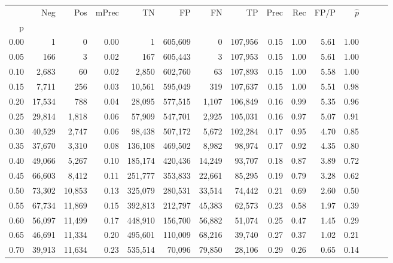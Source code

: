 \begin{tabular}{rrrrrrrrrrrrrrr}
\toprule
{} &     Neg &     Pos & mPrec &       TN &       FP &       FN &       TP &  Prec &   Rec &  FP/P & $\hat{p}$ \\
p    &         &         &       &          &          &          &          &       &       &       &           \\
\midrule
0.00 &       1 &       0 &  0.00 &        1 &  605,609 &        0 &  107,956 &  0.15 &  1.00 &  5.61 &      1.00 \\
0.05 &     166 &       3 &  0.02 &      167 &  605,443 &        3 &  107,953 &  0.15 &  1.00 &  5.61 &      1.00 \\
0.10 &   2,683 &      60 &  0.02 &    2,850 &  602,760 &       63 &  107,893 &  0.15 &  1.00 &  5.58 &      1.00 \\
0.15 &   7,711 &     256 &  0.03 &   10,561 &  595,049 &      319 &  107,637 &  0.15 &  1.00 &  5.51 &      0.98 \\
0.20 &  17,534 &     788 &  0.04 &   28,095 &  577,515 &    1,107 &  106,849 &  0.16 &  0.99 &  5.35 &      0.96 \\
0.25 &  29,814 &   1,818 &  0.06 &   57,909 &  547,701 &    2,925 &  105,031 &  0.16 &  0.97 &  5.07 &      0.91 \\
0.30 &  40,529 &   2,747 &  0.06 &   98,438 &  507,172 &    5,672 &  102,284 &  0.17 &  0.95 &  4.70 &      0.85 \\
0.35 &  37,670 &   3,310 &  0.08 &  136,108 &  469,502 &    8,982 &   98,974 &  0.17 &  0.92 &  4.35 &      0.80 \\
0.40 &  49,066 &   5,267 &  0.10 &  185,174 &  420,436 &   14,249 &   93,707 &  0.18 &  0.87 &  3.89 &      0.72 \\
0.45 &  66,603 &   8,412 &  0.11 &  251,777 &  353,833 &   22,661 &   85,295 &  0.19 &  0.79 &  3.28 &      0.62 \\
0.50 &  73,302 &  10,853 &  0.13 &  325,079 &  280,531 &   33,514 &   74,442 &  0.21 &  0.69 &  2.60 &      0.50 \\
0.55 &  67,734 &  11,869 &  0.15 &  392,813 &  212,797 &   45,383 &   62,573 &  0.23 &  0.58 &  1.97 &      0.39 \\
0.60 &  56,097 &  11,499 &  0.17 &  448,910 &  156,700 &   56,882 &   51,074 &  0.25 &  0.47 &  1.45 &      0.29 \\
0.65 &  46,691 &  11,334 &  0.20 &  495,601 &  110,009 &   68,216 &   39,740 &  0.27 &  0.37 &  1.02 &      0.21 \\
0.70 &  39,913 &  11,634 &  0.23 &  535,514 &   70,096 &   79,850 &   28,106 &  0.29 &  0.26 &  0.65 &      0.14 \\

\end{tabular}
